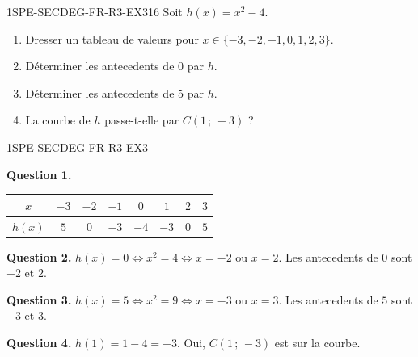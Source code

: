 
\begin{exercice}{1SPE-SECDEG-FR-R3-EX3}{1}{6}
Soit $h(x) = x^2 - 4$.
\begin{enumerate}
  \item Dresser un tableau de valeurs pour $x \in \{-3, -2, -1, 0, 1, 2, 3\}$.
  \item Déterminer les antecedents de $0$ par $h$.
  \item Déterminer les antecedents de $5$ par $h$.
  \item La courbe de $h$ passe-t-elle par $C(1\,;\,-3)$ ?
\end{enumerate}
\end{exercice}


\begin{corrige}{1SPE-SECDEG-FR-R3-EX3}

\textbf{Question 1.}

\begin{center}
\begin{tabular}{|c|c|c|c|c|c|c|c|}
\hline
$x$ & $-3$ & $-2$ & $-1$ & $0$ & $1$ & $2$ & $3$ \\
\hline
$h(x)$ & $5$ & $0$ & $-3$ & $-4$ & $-3$ & $0$ & $5$ \\
\hline
\end{tabular}
\end{center}

\textbf{Question 2.} $h(x) = 0 \Leftrightarrow x^2 = 4 \Leftrightarrow x = -2$ ou $x = 2$. Les antecedents de $0$ sont $-2$ et $2$.

\textbf{Question 3.} $h(x) = 5 \Leftrightarrow x^2 = 9 \Leftrightarrow x = -3$ ou $x = 3$. Les antecedents de $5$ sont $-3$ et $3$.

\textbf{Question 4.} $h(1) = 1 - 4 = -3$. Oui, $C(1\,;\,-3)$ est sur la courbe. \checkmark

\end{corrige}


